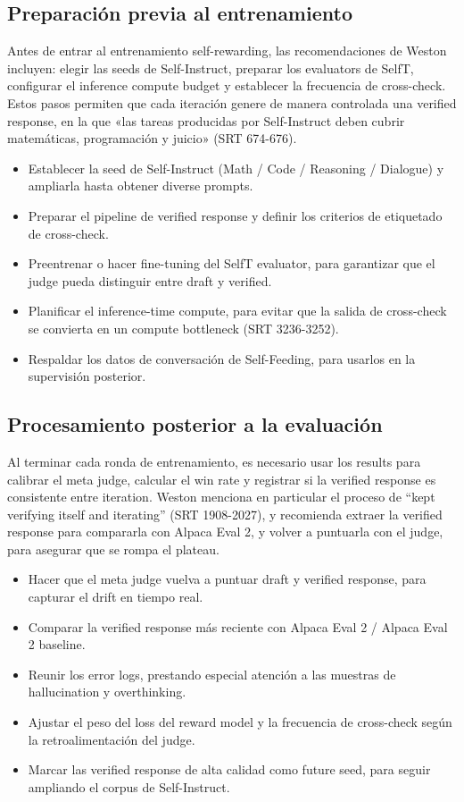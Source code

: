 \documentclass[a4paper]{article}
\begin{document}
\subsection{Preparación previa al entrenamiento}
Antes de entrar al entrenamiento self-rewarding, las recomendaciones de Weston incluyen: elegir las seeds de Self-Instruct, preparar los evaluators de SelfT, configurar el inference compute budget y establecer la frecuencia de cross-check. Estos pasos permiten que cada iteración genere de manera controlada una verified response, en la que «las tareas producidas por Self-Instruct deben cubrir matemáticas, programación y juicio» (SRT 674-676).

\begin{itemize}
    \item Establecer la seed de Self-Instruct (Math / Code / Reasoning / Dialogue) y ampliarla hasta obtener diverse prompts.
    \item Preparar el pipeline de verified response y definir los criterios de etiquetado de cross-check.
    \item Preentrenar o hacer fine-tuning del SelfT evaluator, para garantizar que el judge pueda distinguir entre draft y verified.
    \item Planificar el inference-time compute, para evitar que la salida de cross-check se convierta en un compute bottleneck (SRT 3236-3252).
    \item Respaldar los datos de conversación de Self-Feeding, para usarlos en la supervisión posterior.
\end{itemize}

\subsection{Procesamiento posterior a la evaluación}
Al terminar cada ronda de entrenamiento, es necesario usar los results para calibrar el meta judge, calcular el win rate y registrar si la verified response es consistente entre iteration. Weston menciona en particular el proceso de ``kept verifying itself and iterating'' (SRT 1908-2027), y recomienda extraer la verified response para compararla con Alpaca Eval 2, y volver a puntuarla con el judge, para asegurar que se rompa el plateau.

\begin{itemize}
    \item Hacer que el meta judge vuelva a puntuar draft y verified response, para capturar el drift en tiempo real.
    \item Comparar la verified response más reciente con Alpaca Eval 2 / Alpaca Eval 2 baseline.
    \item Reunir los error logs, prestando especial atención a las muestras de hallucination y overthinking.
    \item Ajustar el peso del loss del reward model y la frecuencia de cross-check según la retroalimentación del judge.
    \item Marcar las verified response de alta calidad como future seed, para seguir ampliando el corpus de Self-Instruct.
\end{itemize}
\end{document}
